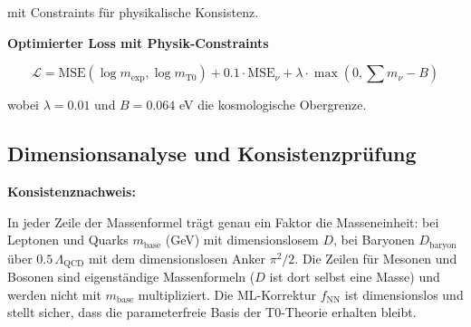 	mit Constraints für physikalische Konsistenz.
	
	\textbf{Optimierter Loss mit Physik-Constraints}
	
	\begin{equation}
		\mathcal{L} = \text{MSE}(\log m_{\exp}, \log m_{\text{T0}}) + 0.1 \cdot \text{MSE}_{\nu} + \lambda \cdot \max(0, \sum m_{\nu} - B)
	\end{equation}
	
	wobei $\lambda = 0.01$ und $B = 0.064$ eV die kosmologische Obergrenze.
	
	\subsection{Dimensionsanalyse und Konsistenzprüfung}
	
	\begin{table}[h]
		\centering
		\caption{Dimensionsanalyse der erweiterten T0-Parameter}
		\label{tab:dimensions}
	\end{table}
	
	\textbf{Konsistenznachweis:}
	
	In jeder Zeile der Massenformel trägt genau ein Faktor die Masseneinheit: bei Leptonen und Quarks $m_{\text{base}}$ (GeV) mit dimensionslosem $D$, bei Baryonen $D_{\text{baryon}}$ über $0.5\,\Lambda_{\text{QCD}}$ mit dem dimensionslosen Anker $\pi^2/2$. Die Zeilen für Mesonen und Bosonen sind eigenständige Massenformeln ($D$ ist dort selbst eine Masse) und werden nicht mit $m_{\text{base}}$ multipliziert. Die ML-Korrektur $f_{\text{NN}}$ ist dimensionslos und stellt sicher, dass die parameterfreie Basis der T0-Theorie erhalten bleibt.
	

